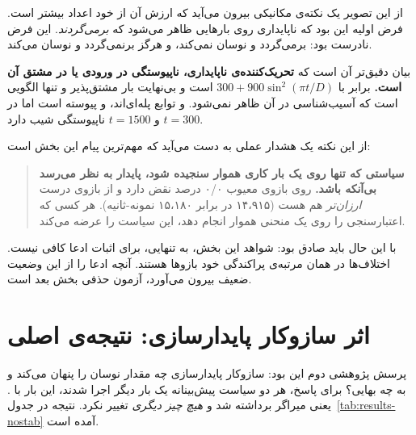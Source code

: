 از این تصویر یک نکته‌ی مکانیکی بیرون می‌آید که ارزش آن از خود اعداد بیشتر است. فرض اولیه این
بود که ناپایداری روی بارهایی ظاهر می‌شود که \emph{برمی‌گردند}. این فرض نادرست بود:
 برمی‌گردد و نوسان نمی‌کند، و  هرگز برنمی‌گردد و نوسان می‌کند.

بیان دقیق‌تر آن است که \textbf{تحریک‌کننده‌ی ناپایداری، ناپیوستگی در ورودی یا در مشتق آن
است.}  برابر با $300 + 900\sin^2(\pi t / D)$ است و بی‌نهایت بار مشتق‌پذیر \mdash{} و
تنها الگویی است که آسیب‌شناسی در آن ظاهر نمی‌شود.  و  توابع پله‌ای‌اند،
و  پیوسته است اما در $t = 300$ و $t = 1500$ ناپیوستگی شیب دارد.

از این نکته یک هشدار عملی به دست می‌آید که مهم‌ترین پیام این بخش است:

\begin{quote}
\textbf{سیاستی که تنها روی یک بار کاری هموار سنجیده شود، پایدار به نظر می‌رسد بی‌آنکه باشد.}
روی  بازوی معیوب ۰/۰ درصد نقض دارد و از بازوی درست \emph{ارزان‌تر} هم هست
(۱۴،۹۱۵ در برابر ۱۵،۱۸۰ نمونه-ثانیه). هر کسی که اعتبارسنجی را روی یک منحنی هموار انجام دهد،
این سیاست را عرضه می‌کند.
\end{quote}

با این حال باید صادق بود: شواهد این بخش، به تنهایی، برای اثبات ادعا کافی نیست. اختلاف‌ها در
همان مرتبه‌ی پراکندگی خود بازوها هستند. آنچه ادعا را از این وضعیت ضعیف بیرون می‌آورد، آزمون
حذفی بخش بعد است.

\section{اثر سازوکار پایدارسازی: نتیجه‌ی اصلی}
\label{sec:results-stabilizer}

پرسش پژوهشی دوم این بود: سازوکار پایدارسازی چه مقدار نوسان را پنهان می‌کند و به چه بهایی؟
برای پاسخ، هر دو سیاست پیش‌بینانه یک بار دیگر اجرا شدند، این بار با
. یعنی میراگر برداشته شد و \emph{هیچ چیز دیگری} تغییر
نکرد. نتیجه در جدول~\ref{tab:results-nostab} آمده است.


